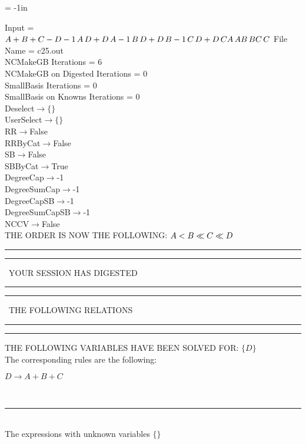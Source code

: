 \voffset = -1in
\evensidemargin 0.1in
\oddsidemargin 0.1in
\textheight 9in
\textwidth 6in

\normalsize
\baselineskip=12pt
\noindent
Input = 
$
\\A + B + C - D\\
-1\,
 A\,
 D + D\,
 A\\
-1\,
 B\,
 D + D\,
 B\\
-1\,
 C\,
 D + D\,
 C\\
A\,
 A\\
B\,
 B\\
C\,
 C\\
$
File Name = c25.out\\
NCMakeGB Iterations = 6\\
NCMakeGB on Digested Iterations = 0\\
SmallBasis Iterations = 0\\
SmallBasis on Knowns Iterations = 0\\
Deselect$\rightarrow \{\}$\\
UserSelect$\rightarrow \{\}$\\
RR$\rightarrow $False\\
RRByCat$\rightarrow $False\\
SB$\rightarrow $False\\
SBByCat$\rightarrow $True\\
DegreeCap$\rightarrow $-1\\
DegreeSumCap$\rightarrow $-1\\
DegreeCapSB$\rightarrow $-1\\
DegreeSumCapSB$\rightarrow $-1\\
NCCV$\rightarrow $False\\
THE ORDER IS NOW THE FOLLOWING:\hfil\break
$
A<B\ll
C\ll
D\\
$
\rule[2pt]{6in}{4pt}\hfil\break
\rule[2pt]{1.879in}{4pt}
\ YOUR SESSION HAS DIGESTED\ 
\rule[2pt]{1.879in}{4pt}\hfil\break
\rule[2pt]{1.923in}{4pt}
\ THE FOLLOWING RELATIONS\ 
\rule[2pt]{1.923in}{4pt}\hfil\break
\rule[2pt]{6in}{4pt}\hfil\break
THE FOLLOWING VARIABLES HAVE BEEN SOLVED FOR:\hfil\break
$\{D\}$
\smallskip\\
The corresponding rules are the following:\smallskip\\
\begin{minipage}{6in}
$
D\rightarrow A + B + C
$
\end{minipage}\medskip\\
\rule[3pt]{6in}{.7pt}\\
The expressions with unknown variables $\{\}$\\

